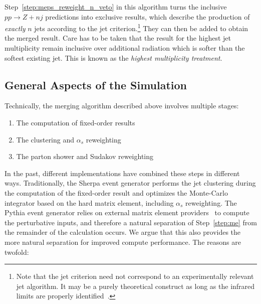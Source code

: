 \documentclass[aps,prd,twocolumn,fleqn,superscriptaddress,groupedaddress,nofootinbib,preprintnumbers]{revtex4}
\begin{document}
Step~\ref{step:meps_reweight_n_veto} in this algorithm turns the inclusive
$pp\to Z+nj$ predictions into exclusive results, which describe the production
of {\it exactly} $n$ jets according to the jet criterion.\footnote{
  Note that the jet criterion need not correspond to an experimentally relevant
  jet algorithm. It may be a purely theoretical construct as long as the infrared
  limits are properly identified~\cite{Salam:2009jx}.}
They can then be added to obtain the merged result. Care has to be taken that
the result for the highest jet multiplicity remain inclusive over additional
radiation which is softer than the softest existing jet. This is known as the
{\it highest multiplicity treatment}.

\subsection{General Aspects of the Simulation}
Technically, the merging algorithm described above involves multiple stages:
\begin{enumerate}
\item\label{step:me} The computation of fixed-order results
\item The clustering and $\alpha_s$ reweighting
\item The parton shower and Sudakov reweighting
\end{enumerate}
In the past, different implementations have combined these steps in different
ways. Traditionally, the Sherpa event generator performs the jet clustering
during the computation of the fixed-order result and optimizes the Monte-Carlo
integrator based on the hard matrix element, including $\alpha_s$ reweighting.
The Pythia event generator relies on external matrix element providers~\cite{Alwall:2006yp}
to compute the perturbative inputs, and therefore a natural separation of Step~\ref{step:me}
from the remainder of the calculation occurs. We argue that this also provides the
more natural separation for improved compute performance. The reasons are twofold:
\end{document}
